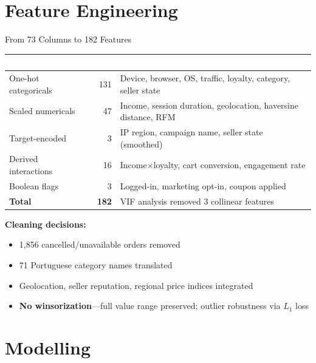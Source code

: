 \documentclass[aspectratio=169,10pt]{beamer}
\begin{document}
\section{Feature Engineering}

\begin{frame}{From 73 Columns to 182 Features}
  \small
  \begin{tabularx}{\textwidth}{l r X}
    \toprule
    \rowcolor{brandcolor}
    \textcolor{white}{\textbf{Group}} & \textcolor{white}{\textbf{Count}} & \textcolor{white}{\textbf{Examples}} \\
    \midrule
    One-hot categoricals    & 131 & Device, browser, OS, traffic, loyalty, category, seller state \\
    Scaled numericals       &  47 & Income, session duration, geolocation, haversine distance, RFM \\
    Target-encoded          &   3 & IP region, campaign name, seller state (smoothed) \\
    Derived interactions    &  16 & Income$\times$loyalty, cart conversion, engagement rate \\
    Boolean flags           &   3 & Logged-in, marketing opt-in, coupon applied \\
    \midrule
    \rowcolor{accentcolor!15}
    \textbf{Total}          & \textbf{182} & VIF analysis removed 3 collinear features \\
    \bottomrule
  \end{tabularx}

  \vspace{8pt}
  \textbf{Cleaning decisions:}
  \begin{itemize}
    \item 1{,}856 cancelled/unavailable orders removed
    \item 71 Portuguese category names translated
    \item Geolocation, seller reputation, regional price indices integrated
    \item \textbf{No winsorization}---full value range preserved; outlier
          robustness via $L_{1}$ loss
  \end{itemize}
\end{frame}

\section{Modelling}
\end{document}
